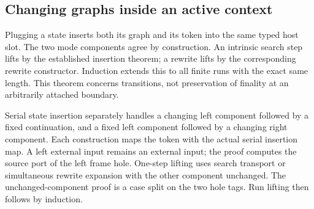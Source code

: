 


\subsection{Changing graphs inside an active context}

Plugging a state inserts both its graph and its token into the same
typed host slot. The two mode components agree by construction. An intrinsic
search step lifts by the established insertion theorem; a rewrite lifts by
the corresponding rewrite constructor. Induction extends this to all finite
runs with the exact same length. This theorem concerns transitions, not
preservation of finality at an arbitrarily attached boundary.




Serial state insertion separately handles a changing left component
followed by a fixed continuation, and a fixed left component followed by a
changing right component. Each construction maps the token with the actual
serial insertion map. A left external input remains an external input; the
proof computes the source port of the left frame hole. One-step lifting uses
search transport or simultaneous rewrite expansion with the other component
unchanged. The unchanged-component proof is a case split on the two hole
tags. Run lifting then follows by induction.








